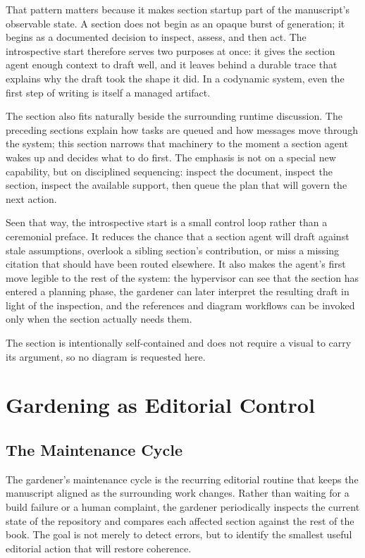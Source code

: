 \documentclass[11pt]{article}
\begin{document}
That pattern matters because it makes section startup part of the manuscript's observable state. A section does not begin as an opaque burst of generation; it begins as a documented decision to inspect, assess, and then act. The introspective start therefore serves two purposes at once: it gives the section agent enough context to draft well, and it leaves behind a durable trace that explains why the draft took the shape it did. In a codynamic system, even the first step of writing is itself a managed artifact.

The section also fits naturally beside the surrounding runtime discussion. The preceding sections explain how tasks are queued and how messages move through the system; this section narrows that machinery to the moment a section agent wakes up and decides what to do first. The emphasis is not on a special new capability, but on disciplined sequencing: inspect the document, inspect the section, inspect the available support, then queue the plan that will govern the next action.

Seen that way, the introspective start is a small control loop rather than a ceremonial preface. It reduces the chance that a section agent will draft against stale assumptions, overlook a sibling section's contribution, or miss a missing citation that should have been routed elsewhere. It also makes the agent's first move legible to the rest of the system: the hypervisor can see that the section has entered a planning phase, the gardener can later interpret the resulting draft in light of the inspection, and the references and diagram workflows can be invoked only when the section actually needs them.

The section is intentionally self-contained and does not require a visual to carry its argument, so no diagram is requested here.



\section{Gardening as Editorial Control}

\subsection{The Maintenance Cycle}


The gardener's maintenance cycle is the recurring editorial routine that keeps the manuscript aligned as the surrounding work changes. Rather than waiting for a build failure or a human complaint, the gardener periodically inspects the current state of the repository and compares each affected section against the rest of the book. The goal is not merely to detect errors, but to identify the smallest useful editorial action that will restore coherence.
\end{document}
